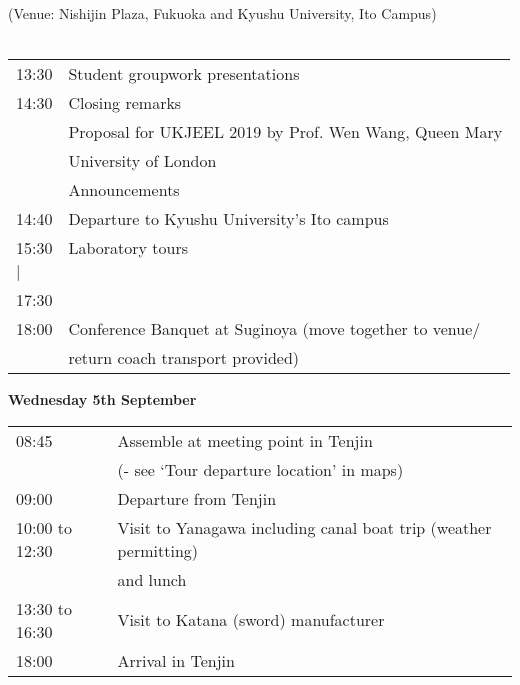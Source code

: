 \newpage
\vspace*{3ex}
 (Venue: Nishijin Plaza, Fukuoka and Kyushu University, Ito Campus) \\

\\
\noindent\begin{tabular}{|l|l|}
    \hline
    13:30   & Student groupwork presentations \\
    14:30   & Closing remarks \\
            & Proposal for UKJEEL 2019 by Prof. Wen Wang, Queen Mary\\ 
            & University of London \\
            & Announcements \\
    14:40   & Departure to Kyushu University's Ito campus \\
    15:30   & Laboratory tours \\ %
    \hspace{1em}$\mid$  & \\
    17:30   & \\
    18:00   & Conference Banquet at Suginoya (move together to venue/ \\
            & \hspace{11em} return coach transport provided)\\
    \hline
\end{tabular}
\vspace*{3ex}



\newpage
\begin{center}
{\bf \large Wednesday 5th September}
\end{center}
\vspace*{3ex}

\noindent\begin{tabular}{|l|l|}
    \hline
    08:45           & Assemble at meeting point in Tenjin \\
                    & \hspace*{4em} (- see `Tour departure location' in maps) \\
    09:00           & Departure from Tenjin \\
    10:00 to 12:30  & Visit to Yanagawa including canal boat trip (weather permitting) \\
                    & and lunch\\
    13:30 to 16:30  & Visit to Katana (sword) manufacturer \\
    18:00           & Arrival in Tenjin\\
    \hline
\end{tabular}
